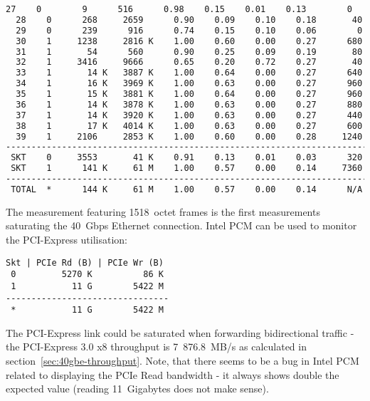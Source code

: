 \begin{lstlisting}[language=TeX]
  27    0        9      516      0.98    0.15    0.01    0.13        0
  28    0      268     2659      0.90    0.09    0.10    0.18       40
  29    0      239      916      0.74    0.15    0.10    0.06        0
  30    1     1238     2816 K    1.00    0.60    0.00    0.27      680
  31    1       54      560      0.90    0.25    0.09    0.19       80
  32    1     3416     9666      0.65    0.20    0.72    0.27       40
  33    1       14 K   3887 K    1.00    0.64    0.00    0.27      640
  34    1       16 K   3969 K    1.00    0.63    0.00    0.27      960
  35    1       15 K   3881 K    1.00    0.64    0.00    0.27      960
  36    1       14 K   3878 K    1.00    0.63    0.00    0.27      880
  37    1       14 K   3920 K    1.00    0.63    0.00    0.27      440
  38    1       17 K   4014 K    1.00    0.63    0.00    0.27      600
  39    1     2106     2853 K    1.00    0.60    0.00    0.28     1240
------------------------------------------------------------------------
 SKT    0     3553       41 K    0.91    0.13    0.01    0.03      320
 SKT    1      141 K     61 M    1.00    0.57    0.00    0.14     7360
------------------------------------------------------------------------
 TOTAL  *      144 K     61 M    1.00    0.57    0.00    0.14      N/A 
\end{lstlisting}
The measurement featuring 1518~octet frames is the first measurements saturating the 40~Gbps Ethernet connection.
Intel PCM can be used to monitor the PCI-Express utilisation:
\begin{lstlisting}
Skt | PCIe Rd (B) | PCIe Wr (B)
 0         5270 K          86 K
 1           11 G        5422 M
--------------------------------
 *           11 G        5422 M
\end{lstlisting}
The PCI-Express link could be saturated when forwarding bidirectional traffic
- the PCI-Express 3.0 x8 throughput is 7~876.8~MB/s as calculated in section~\ref{sec:40gbe-throughput}.
Note, that there seems to be a bug in Intel PCM related to displaying
the PCIe Read bandwidth - it always shows double the expected value (reading 11~Gigabytes does not make sense).

